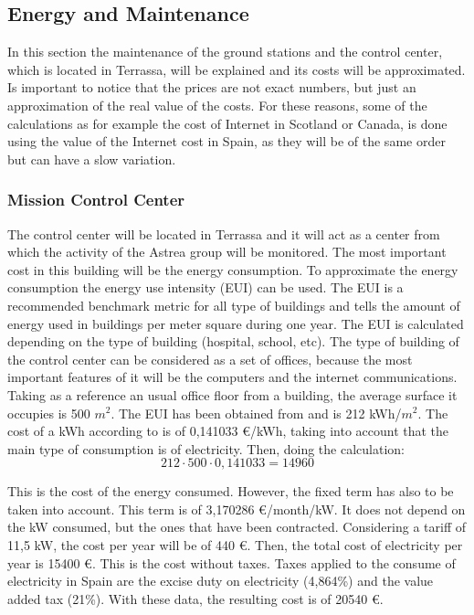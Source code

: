 \subsection{Energy and Maintenance}
In this section the maintenance of the ground stations and the control center, which is located in Terrassa, will be explained and its costs will be approximated. Is important to notice that the prices are not exact numbers, but just an approximation of the real value of the costs. For these reasons, some of the calculations as for example the cost of Internet in Scotland or Canada, is done using the value of the Internet cost in Spain, as they will be of the same order but can have a slow variation.

\subsubsection{Mission Control Center}
The control center will be located in Terrassa and it will act as a center from which the activity of the Astrea group will be monitored. The most important cost in this building will be the energy consumption. To approximate the energy consumption the energy use intensity (EUI) can be used. The EUI is a recommended benchmark metric for all type of buildings and tells the amount of energy used in buildings per meter square during one year. The EUI is calculated depending on the type of building (hospital, school, etc). The type of building of the control center can be considered as a set of offices, because the most important features of it will be the computers and the internet communications. Taking as a reference an usual office floor from a building, the average surface it occupies is 500 $m^2$. The EUI has been obtained from \cite{EUI} and is 212 kWh/$m^2$. The cost of a kWh according to \cite{endesa} is of 0,141033 \euro /kWh, taking into account that the main type of consumption is of electricity. Then, doing the calculation:
\begin{equation}
212 \cdot 500 \cdot 0,141033 = 14960
\end{equation}

This is the cost of the energy consumed. However, the fixed term has also to be taken into account. This term is of 3,170286 \euro /month/kW. It does not depend on the kW consumed, but the ones that have been contracted. Considering a tariff of 11,5 kW, the cost per year will be of 440 \euro. Then, the total cost of electricity per year is 15400 \euro. This is the cost without taxes. Taxes applied to the consume of electricity in Spain are the excise duty on electricity (4,864\%) and the value added tax (21\%). With these data, the resulting cost is of 20540 \euro.

